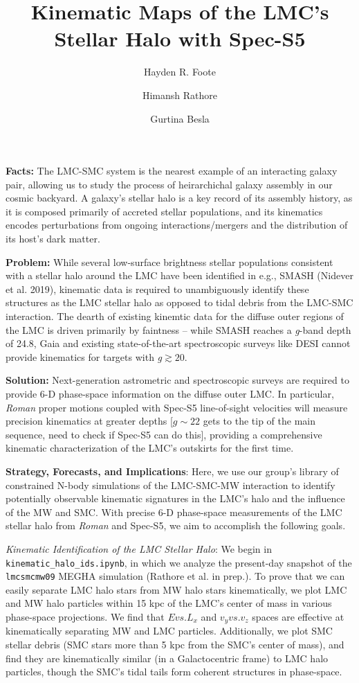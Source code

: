 \title{Kinematic Maps of the LMC's Stellar Halo with Spec-S5}

\author{Hayden R. Foote}

\author{Himansh Rathore}

\author{Gurtina Besla}

\textbf{Facts:} The LMC-SMC system is the nearest example of an interacting galaxy pair, allowing us to study the process of heirarchichal galaxy assembly in our cosmic backyard. A galaxy's stellar halo is a key record of its assembly history, as it is composed primarily of accreted stellar populations, and its kinematics encodes perturbations from ongoing interactions/mergers and the distribution of its host's dark matter.

\textbf{Problem:} While several low-surface brightness stellar populations consistent with a stellar halo around the LMC have been identified in e.g., SMASH (Nidever et al. 2019), kinematic data is required to unambiguously identify these structures as the LMC stellar halo as opposed to tidal debris from the LMC-SMC interaction. The dearth of existing kinemtic data for the diffuse outer regions of the LMC is driven primarily by faintness -- while SMASH reaches a \textit{g}-band depth of 24.8, Gaia and existing state-of-the-art spectroscopic surveys like DESI cannot provide kinematics for targets with \textit{g}$\gtrsim 20$. 

\textbf{Solution:} Next-generation astrometric and spectroscopic surveys are required to provide 6-D phase-space information on the diffuse outer LMC. In particular, \textit{Roman} proper motions coupled with Spec-S5 line-of-sight velocities will measure precision kinematics at greater depths [$g\sim22$ gets to the tip of the main sequence, need to check if Spec-S5 can do this], providing a comprehensive kinematic characterization of the LMC's outskirts for the first time. 

\textbf{Strategy, Forecasts, and Implications}: Here, we use our group's library of constrained N-body simulations of the LMC-SMC-MW interaction to identify potentially observable kinematic signatures in the LMC's halo and the influence of the MW and SMC. With precise 6-D phase-space measurements of the LMC stellar halo from \textit{Roman} and Spec-S5, we aim to accomplish the following goals.

\textit{Kinematic Identification of the LMC Stellar Halo}: We begin in \texttt{kinematic_halo_ids.ipynb}, in which we analyze the present-day snapshot of the \texttt{lmcsmcmw09} MEGHA simulation (Rathore et al. in prep.). To prove that we can easily separate LMC halo stars from MW halo stars kinematically, we plot LMC and MW halo particles within 15 kpc of the LMC's center of mass in various phase-space projections. We find that $E vs. L_x$ and $v_y vs. v_z$ spaces are effective at kinematically separating MW and LMC particles. Additionally, we plot SMC stellar debris (SMC stars more than 5 kpc from the SMC's center of mass), and find they are kinematically similar (in a Galactocentric frame) to LMC halo particles, though the SMC's tidal tails form coherent structures in phase-space.

